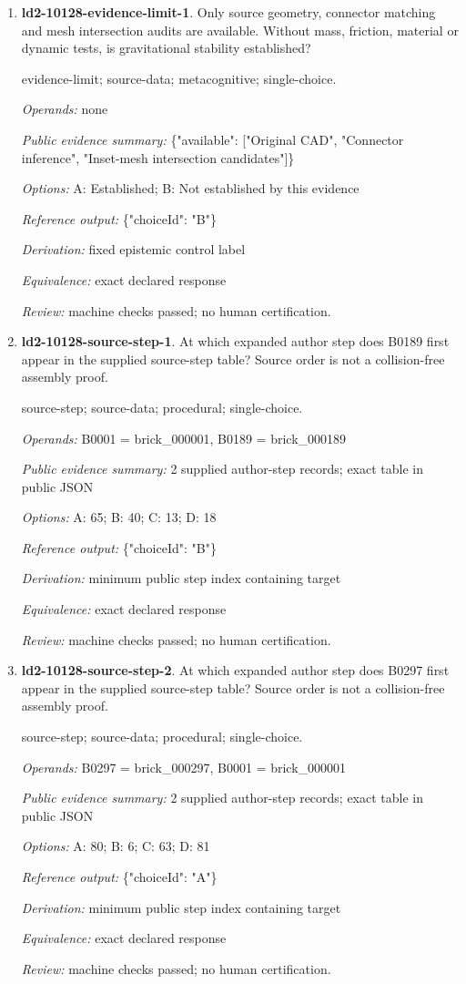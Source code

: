 \begin{enumerate}
\item \textbf{ld2-10128-evidence-limit-1}. Only source geometry, connector matching and mesh intersection audits are available. Without mass, friction, material or dynamic tests, is gravitational stability established?
\par{\small evidence-limit; source-data; metacognitive; single-choice.\par\textit{Operands:} none\par\textit{Public evidence summary:} \{"available": ["Original CAD", "Connector inference", "Inset-mesh intersection candidates"]\}\par\textit{Options:} A: Established; B: Not established by this evidence\par\textit{Reference output:} \{"choiceId": "B"\}\par\textit{Derivation:} fixed epistemic control label\par\textit{Equivalence:} exact declared response\par\textit{Review:} machine checks passed; no human certification.}
\item \textbf{ld2-10128-source-step-1}. At which expanded author step does B0189 first appear in the supplied source-step table? Source order is not a collision-free assembly proof.
\par{\small source-step; source-data; procedural; single-choice.\par\textit{Operands:} B0001 = brick\_000001, B0189 = brick\_000189\par\textit{Public evidence summary:} 2 supplied author-step records; exact table in public JSON\par\textit{Options:} A: 65; B: 40; C: 13; D: 18\par\textit{Reference output:} \{"choiceId": "B"\}\par\textit{Derivation:} minimum public step index containing target\par\textit{Equivalence:} exact declared response\par\textit{Review:} machine checks passed; no human certification.}
\item \textbf{ld2-10128-source-step-2}. At which expanded author step does B0297 first appear in the supplied source-step table? Source order is not a collision-free assembly proof.
\par{\small source-step; source-data; procedural; single-choice.\par\textit{Operands:} B0297 = brick\_000297, B0001 = brick\_000001\par\textit{Public evidence summary:} 2 supplied author-step records; exact table in public JSON\par\textit{Options:} A: 80; B: 6; C: 63; D: 81\par\textit{Reference output:} \{"choiceId": "A"\}\par\textit{Derivation:} minimum public step index containing target\par\textit{Equivalence:} exact declared response\par\textit{Review:} machine checks passed; no human certification.}

\end{enumerate}
